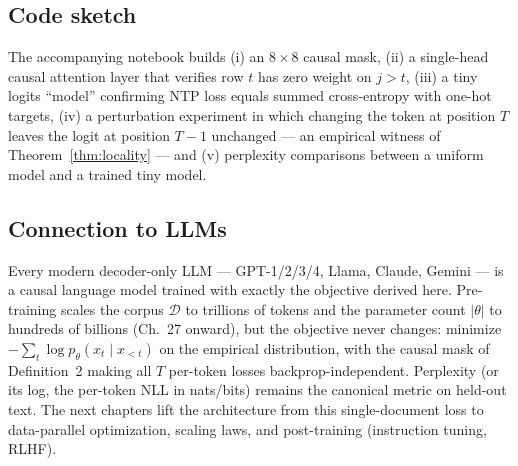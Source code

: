 \subsection*{Code sketch}

The accompanying notebook builds (i) an $8\times 8$ causal mask, (ii) a single-head causal attention layer that verifies row $t$ has zero weight on $j>t$, (iii) a tiny logits ``model'' confirming NTP loss equals summed cross-entropy with one-hot targets, (iv) a perturbation experiment in which changing the token at position $T$ leaves the logit at position $T-1$ unchanged --- an empirical witness of Theorem~\ref{thm:locality} --- and (v) perplexity comparisons between a uniform model and a trained tiny model.

\subsection*{Connection to LLMs}

Every modern decoder-only LLM --- GPT-1/2/3/4, Llama, Claude, Gemini --- is a causal language model trained with exactly the objective derived here. Pre-training scales the corpus $\mathcal{D}$ to trillions of tokens and the parameter count $|\theta|$ to hundreds of billions (Ch.~27 onward), but the objective never changes: minimize $-\sum_t \log p_\theta(x_t\mid x_{<t})$ on the empirical distribution, with the causal mask of Definition~2 making all $T$ per-token losses backprop-independent. Perplexity (or its log, the per-token NLL in nats/bits) remains the canonical metric on held-out text. The next chapters lift the architecture from this single-document loss to data-parallel optimization, scaling laws, and post-training (instruction tuning, RLHF).
